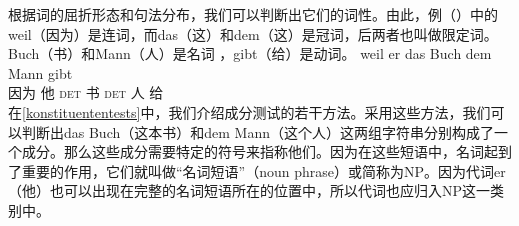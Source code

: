 根据词的屈折形态和句法分布，我们可以判断出它们的词性。由此，例（）中的weil（因为）是连词，而das（这）和dem（这）是冠词，后两者也叫做限定词。Buch（书）和Mann（人）是名词 ，gibt（给）是动词。
\ea\label{bsp-weil-er-das-buch-dem-mann-gibt}
\gll weil er das Buch dem Mann gibt\\
	 因为 他 \textsc{det} 书 \textsc{det} 人 给\\
\z
在\ref{konstituententests}中，我们介绍成分测试的若干方法。采用这些方法，我们可以判断出das Buch（这本书）和dem Mann（这个人）这两组字符串分别构成了一个成分。那么这些成分需要特定的符号来指称他们。因为在这些短语中，名词起到了重要的作用，它们就叫做“名词短语”（noun phrase）或简称为NP。因为代词er（他）也可以出现在完整的名词短语所在的位置中，所以代词也应归入NP这一类别中。

